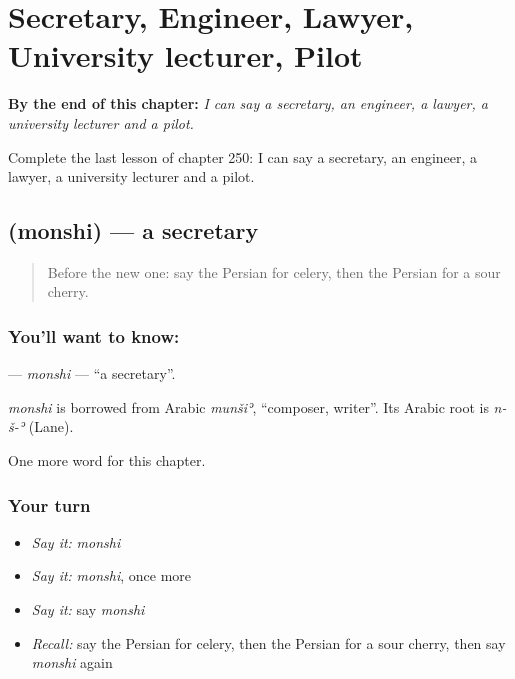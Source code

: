 
\chapter{Secretary, Engineer, Lawyer, University lecturer, Pilot}
\label{ch:fa-secretary-engineer-lawyer-university-lecturer-pilot}

\begin{chapteropening}
\textbf{By the end of this chapter:} \emph{I can say a secretary, an engineer, a lawyer, a university lecturer and a pilot.}

Complete the last lesson of chapter 250: I can say a secretary, an engineer, a lawyer, a university lecturer and a pilot.
\end{chapteropening}

\section[\texorpdfstring{\fa{منشی} (monshi)}{منشی (monshi)}]{ (monshi) — a secretary}

\label{lesson:FA-C250-monshi}



\begin{quote}
Before the new one: say the Persian for celery, then the Persian for a sour cherry.
\end{quote}

\subsection*{You'll want to know: }
\textbf{} — \emph{monshi} — \textquotedblleft{}a secretary\textquotedblright{}.

\begin{cousinweb}
\emph{monshi} is borrowed from Arabic \emph{munšiʾ}, \textquotedblleft{}composer, writer\textquotedblright{}. Its Arabic root is \emph{n-š-ʾ} (Lane).
\end{cousinweb}

\begin{grammarlens}[title={What you've built}]
One more word for this chapter.
\end{grammarlens}

\subsection*{Your turn}
\begin{itemize}
\raggedright
  \item \emph{Say it:} \emph{monshi}
  \item \emph{Say it:} \emph{monshi}, once more
  \item \emph{Say it:} say \emph{monshi}
  \item \emph{Recall:} say the Persian for celery, then the Persian for a sour cherry, then say \emph{monshi} again
\end{itemize}

